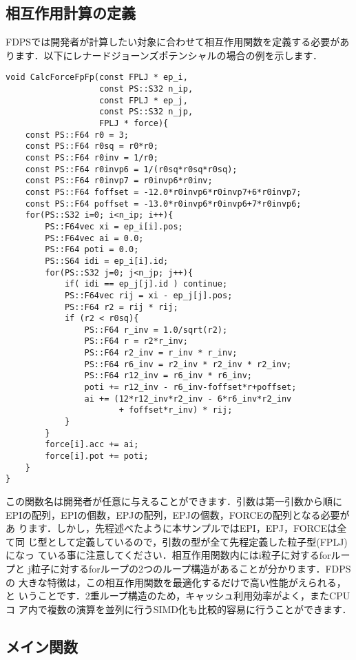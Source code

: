 \documentclass[twocolumn,10pt]{jarticle}
\begin{document}
\subsection{相互作用計算の定義}

FDPSでは開発者が計算したい対象に合わせて相互作用関数を定義する必要があ
ります．以下にレナードジョーンズポテンシャルの場合の例を示します．
{\scriptsize
\begin{verbatim}
void CalcForceFpFp(const FPLJ * ep_i,
                   const PS::S32 n_ip,
                   const FPLJ * ep_j,
                   const PS::S32 n_jp,
                   FPLJ * force){
    const PS::F64 r0 = 3;
    const PS::F64 r0sq = r0*r0;
    const PS::F64 r0inv = 1/r0;
    const PS::F64 r0invp6 = 1/(r0sq*r0sq*r0sq);
    const PS::F64 r0invp7 = r0invp6*r0inv;
    const PS::F64 foffset = -12.0*r0invp6*r0invp7+6*r0invp7;
    const PS::F64 poffset = -13.0*r0invp6*r0invp6+7*r0invp6;
    for(PS::S32 i=0; i<n_ip; i++){
        PS::F64vec xi = ep_i[i].pos;
        PS::F64vec ai = 0.0;
        PS::F64 poti = 0.0;
        PS::S64 idi = ep_i[i].id;
        for(PS::S32 j=0; j<n_jp; j++){
            if( idi == ep_j[j].id ) continue;
            PS::F64vec rij = xi - ep_j[j].pos;
            PS::F64 r2 = rij * rij;
            if (r2 < r0sq){
                PS::F64 r_inv = 1.0/sqrt(r2);
                PS::F64 r = r2*r_inv;
                PS::F64 r2_inv = r_inv * r_inv;
                PS::F64 r6_inv = r2_inv * r2_inv * r2_inv;
                PS::F64 r12_inv = r6_inv * r6_inv;
                poti += r12_inv - r6_inv-foffset*r+poffset;
                ai += (12*r12_inv*r2_inv - 6*r6_inv*r2_inv 
                       + foffset*r_inv) * rij;
            }
        }
        force[i].acc += ai;
        force[i].pot += poti;
    }
}
\end{verbatim}
}

この関数名は開発者が任意に与えることができます．引数は第一引数から順に
EPIの配列，EPIの個数，EPJの配列，EPJの個数，FORCEの配列となる必要があ
ります．しかし，先程述べたように本サンプルではEPI，EPJ，FORCEは全て同
じ型として定義しているので，引数の型が全て先程定義した粒子型(FPLJ)になっ
ている事に注意してください．相互作用関数内にはi粒子に対するforループと
j粒子に対するforループの2つのループ構造があることが分かります．FDPSの
大きな特徴は，この相互作用関数を最適化するだけで高い性能がえられる，と
いうことです．2重ループ構造のため，キャッシュ利用効率がよく，またCPUコ
ア内で複数の演算を並列に行うSIMD化も比較的容易に行うことができます．

\subsection{メイン関数}
\end{document}
